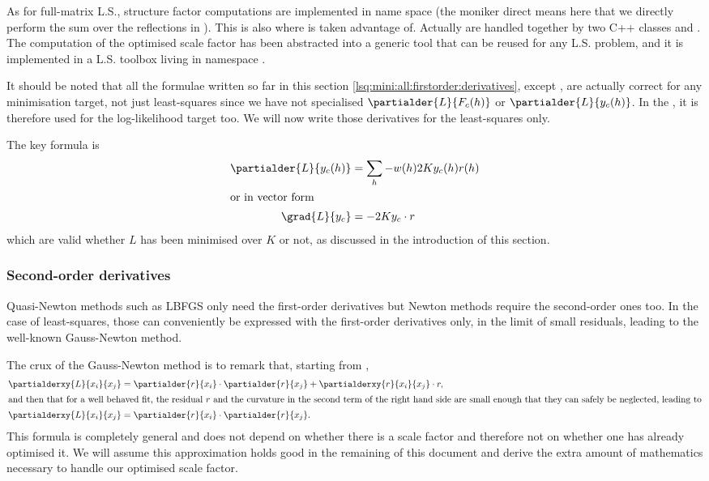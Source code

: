 \documentclass[11pt]{article}
\begin{document}
As for full-matrix L.S., structure factor computations are implemented in name space  (the moniker direct means here that we directly perform the sum over the reflections in ). This is also where  is taken advantage of. Actually  are handled together by two C++ classes  and . The computation of the optimised scale factor has been abstracted into a generic tool that can be reused for any L.S. problem, and it is implemented in a L.S. toolbox living in namespace .

It should be noted that all the formulae written so far in this section \ref{lsq:mini:all:firstorder:derivatives}, except , are actually correct for any minimisation target, not just least-squares since we have not specialised $\partialder{L}{F_c(h)}$ or $\partialder{L}{y_c(h)}$. In the , it is therefore used for the log-likelihood target too. We will now write those derivatives for the least-squares only.

The key formula is
\begin{align}
\partialder{L}{y_c(h)} &= \sum_h - w(h) 2K y_c(h) r(h)\\
\intertext{or in vector form}
\grad{L}{y_c} &= -2K y_c \cdot r
\end{align}
which are valid whether $L$ has been minimised over $K$ or not, as discussed in the introduction of this section.

\subsubsection{Second-order derivatives}

Quasi-Newton methods such as LBFGS only need the first-order derivatives but Newton methods require the second-order ones too. In the case of least-squares, those can conveniently be expressed with the first-order derivatives only, in the limit of small residuals, leading to the well-known Gauss-Newton method.

The crux of the Gauss-Newton method is to remark that, starting from ,
\begin{align}
\partialderxy{L}{x_i}{x_j} &= \partialder{r}{x_i} \cdot \partialder{r}{x_j} + \partialderxy{r}{x_i}{x_j} \cdot r, \nonumber \\
\intertext{and then that for a well behaved fit, the residual $r$ and the curvature in the second term of the right hand side are small enough that they can safely be neglected, leading to}
\partialderxy{L}{x_i}{x_j} &= \partialder{r}{x_i} \cdot \partialder{r}{x_j}. 
\label{eqn:gaussnewtoncrux}
\end{align}
This formula is completely general and does not depend on whether there is a scale factor and therefore not on whether one has already optimised it. We will assume this approximation holds good in the remaining of this document and derive the extra amount of mathematics necessary to handle our optimised scale factor.
\end{document}

